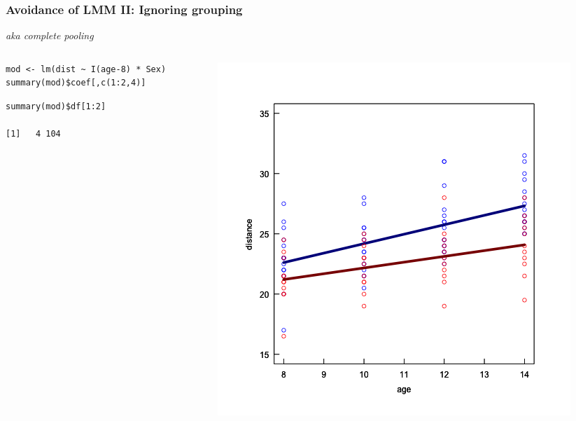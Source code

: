 \documentclass{beamer}
\begin{document}
\begin{frame}[fragile]
    \frametitle{Avoidance of LMM II: Ignoring grouping}
    \textit{aka complete pooling}
    \begin{columns}
        \begin{column}{0.6\textwidth}
            \small\begin{verbatim}
mod <- lm(dist ~ I(age-8) * Sex)
summary(mod)$coef[,c(1:2,4)]
            \end{verbatim}
            \tiny\scalebox{1.2}{
            
            }
            \normalsize\begin{verbatim}
summary(mod)$df[1:2]

[1]   4 104
            \end{verbatim}
        \end{column}
        \begin{column}{0.4\textwidth}
            \includegraphics[width=\textwidth]{lectures/day_6_praxis_and_fitting_of_mems/figures/unnamed-chunk-7-1.png}
        \end{column}
    \end{columns}
    \vspace{0.5cm}
\end{frame}
\end{document}
